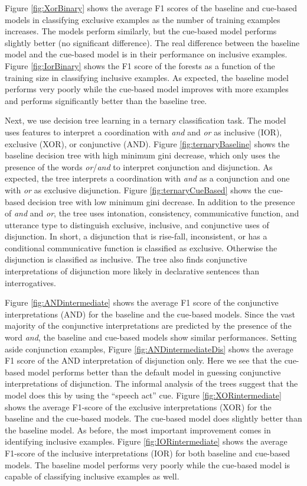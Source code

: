 \documentclass[,man,floatsintext]{apa6}
\begin{document}
Figure \ref{fig:XorBinary} shows the average F1 scores of the baseline and cue-based models in classifying exclusive examples as the number of training examples increases. The models perform similarly, but the cue-based model performs slightly better (no significant difference). The real difference between the baseline model and the cue-based model is in their performance on inclusive examples. Figure \ref{fig:IorBinary} shows the F1 score of the forests as a function of the training size in classifying inclusive examples. As expected, the baseline model performs very poorly while the cue-based model improves with more examples and performs significantly better than the baseline tree.

Next, we use decision tree learning in a ternary classification task. The model uses features to interpret a coordination with \emph{and} and \emph{or} as inclusive (IOR), exclusive (XOR), or conjunctive (AND). Figure \ref{fig:ternaryBaseline} shows the baseline decision tree with high minimum gini decrease, which only uses the presence of the words \emph{or}/\emph{and} to interpret conjunction and disjunction. As expected, the tree interprets a coordination with \emph{and} as a conjunction and one with \emph{or} as exclusive disjunction. Figure \ref{fig:ternaryCueBased} shows the cue-based decision tree with low minimum gini decrease. In addition to the presence of \emph{and} and \emph{or}, the tree uses intonation, consistency, communicative function, and utterance type to distinguish exclusive, inclusive, and conjunctive uses of disjunction. In short, a disjunction that is rise-fall, inconsistent, or has a conditional communicative function is classified as exclusive. Otherwise the disjunction is classified as inclusive. The tree also finds conjunctive interpretations of disjunction more likely in declarative sentences than interrogatives.

Figure \ref{fig:ANDintermediate} shows the average F1 score of the conjunctive interpretations (AND) for the baseline and the cue-based models. Since the vast majority of the conjunctive interpretations are predicted by the presence of the word \emph{and}, the baseline and cue-based models show similar performances. Setting aside conjunction examples, Figure \ref{fig:ANDintermediateDis} shows the average F1 score of the AND interpretation of disjunction only. Here we see that the cue-based model performs better than the default model in guessing conjunctive interpretations of disjunction. The informal analysis of the trees suggest that the model does this by using the \enquote{speech act} cue. Figure \ref{fig:XORintermediate} shows the average F1-score of the exclusive interpretations (XOR) for the baseline and the cue-based models. The cue-based model does slightly better than the baseline model. As before, the most important improvement comes in identifying inclusive examples. Figure \ref{fig:IORintermediate} shows the average F1-score of the inclusive interpretations (IOR) for both baseline and cue-based models. The baseline model performs very poorly while the cue-based model is capable of classifying inclusive examples as well.
\end{document}

